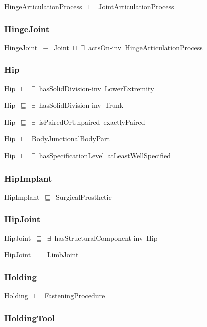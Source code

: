 \documentclass{article}
\begin{document}
HingeArticulationProcess~\ensuremath{\sqsubseteq}~JointArticulationProcess~

\subsubsection*{HingeJoint}

HingeJoint~\ensuremath{\equiv}~Joint~\ensuremath{\sqcap}~\ensuremath{\exists}~actsOn-inv~HingeArticulationProcess

\subsubsection*{Hip}

Hip~\ensuremath{\sqsubseteq}~\ensuremath{\exists}~hasSolidDivision-inv~LowerExtremity~

Hip~\ensuremath{\sqsubseteq}~\ensuremath{\exists}~hasSolidDivision-inv~Trunk~

Hip~\ensuremath{\sqsubseteq}~\ensuremath{\exists}~isPairedOrUnpaired~exactlyPaired~

Hip~\ensuremath{\sqsubseteq}~BodyJunctionalBodyPart~

Hip~\ensuremath{\sqsubseteq}~\ensuremath{\exists}~hasSpecificationLevel~atLeastWellSpecified~

\subsubsection*{HipImplant}

HipImplant~\ensuremath{\sqsubseteq}~SurgicalProsthetic~

\subsubsection*{HipJoint}

HipJoint~\ensuremath{\sqsubseteq}~\ensuremath{\exists}~hasStructuralComponent-inv~Hip~

HipJoint~\ensuremath{\sqsubseteq}~LimbJoint~

\subsubsection*{Holding}

Holding~\ensuremath{\sqsubseteq}~FasteningProcedure~

\subsubsection*{HoldingTool}
\end{document}
